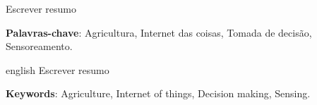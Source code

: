 \documentclass[
article,			%
12pt,				%
oneside,			%
a4paper,			%
english,			%
brazil,				%
sumario=tradicional
]{abntex2}
\begin{document}

\frenchspacing 


%
%

\maketitle



\begin{resumoumacoluna}
  Escrever resumo

  \textbf{Palavras-chave}: Agricultura, Internet das coisas, Tomada de decisão, Sensoreamento.

  \vspace{\onelineskip}

  \noindent
\end{resumoumacoluna}


\renewcommand{\resumoname}{Abstract}
\begin{resumoumacoluna}
  \begin{otherlanguage*}{english}
    Escrever resumo
    \vspace{\onelineskip}
    \noindent

    \textbf {Keywords}: Agriculture, Internet of things, Decision making, Sensing.
  \end{otherlanguage*}  
\end{resumoumacoluna}
\end{document}
